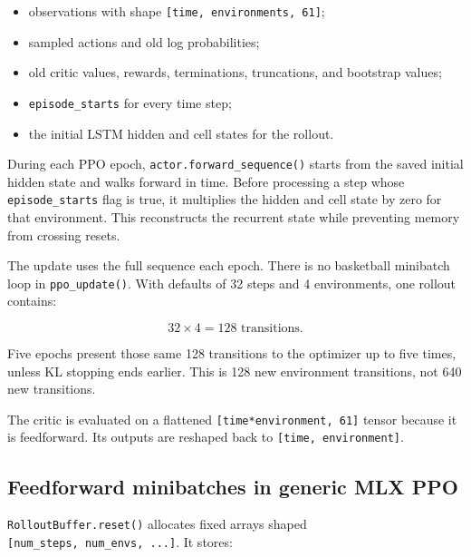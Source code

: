 \documentclass[
  american,
  11pt,
  letterpaper,
]{article}
\providecommand{\tightlist}{%
  \setlength{\itemsep}{0pt}\setlength{\parskip}{0pt}}
\begin{document}
\begin{itemize}
\tightlist
\item
  observations with shape \texttt{{[}time,\ environments,\ 61{]}};
\item
  sampled actions and old log probabilities;
\item
  old critic values, rewards, terminations, truncations, and bootstrap
  values;
\item
  \texttt{episode\_\allowbreak{}starts} for every time step;
\item
  the initial LSTM hidden and cell states for the rollout.
\end{itemize}

During each PPO epoch, \texttt{actor.forward\_sequence()} starts from
the saved initial hidden state and walks forward in time. Before
processing a step whose \texttt{episode\_\allowbreak{}starts} flag is
true, it multiplies the hidden and cell state by zero for that
environment. This reconstructs the recurrent state while preventing
memory from crossing resets.

The update uses the full sequence each epoch. There is no basketball
minibatch loop in \texttt{ppo\_update()}. With defaults of 32 steps and
4 environments, one rollout contains:

\[
32\times4=128\text{ transitions}.
\]

Five epochs present those same 128 transitions to the optimizer up to
five times, unless KL stopping ends earlier. This is 128 new environment
transitions, not 640 new transitions.

The critic is evaluated on a flattened
\texttt{{[}time*environment,\ 61{]}} tensor because it is feedforward.
Its outputs are reshaped back to \texttt{{[}time,\ environment{]}}.

\subsection{Feedforward minibatches in generic MLX
PPO}\label{feedforward-minibatches-in-generic-mlx-ppo}

\texttt{RolloutBuffer.reset()} allocates fixed arrays shaped
\texttt{{[}num\_steps,\ num\_envs,\ ...{]}}. It stores:
\end{document}
